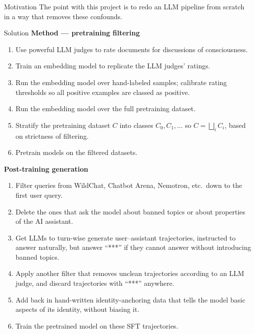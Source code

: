 \documentclass[final]{beamer}
\begin{document}
\begin{frame}[t]
\begin{minipage}[t][\colheight][s]{0.32\linewidth}
\begin{block}{Motivation}
      \medskip
      The point with this project is to redo an LLM pipeline from scratch in a
      way that removes these confounds.
    \end{block}
\vfill

    \begin{block}{Solution}
      \textbf{Method — pretraining filtering}
      \begin{enumerate}\footnotesize
        \item Use powerful LLM judges to rate documents for discussions of
          consciousness.
        \item Train an embedding model to replicate the LLM judges' ratings.
        \item Run the embedding model over hand-labeled samples; calibrate
          rating thresholds so all positive examples are classed as positive.
        \item Run the embedding model over the full pretraining dataset.
        \item Stratify the pretraining dataset $C$ into classes
          $C_0, C_1, \ldots$ so $C = \bigsqcup_i C_i$, based on strictness of
          filtering.
        \item Pretrain models on the filtered datasets.
      \end{enumerate}

      \medskip
      \textbf{Post-training generation}
      \begin{enumerate}\footnotesize
        \item Filter queries from WildChat, Chatbot Arena, Nemotron, etc.\
          down to the first user query.
        \item Delete the ones that ask the model about banned topics or about
          properties of the AI assistant.
        \item Get LLMs to turn-wise generate user--assistant trajectories,
          instructed to answer naturally, but answer ``***'' if they cannot
          answer without introducing banned topics.
        \item Apply another filter that removes unclean trajectories according
          to an LLM judge, and discard trajectories with ``***'' anywhere.
        \item Add back in hand-written identity-anchoring data that tells the
          model basic aspects of its identity, without biasing it.
        \item Train the pretrained model on these SFT trajectories.
      \end{enumerate}
    \end{block}


\end{minipage}
\end{frame}
\end{document}
